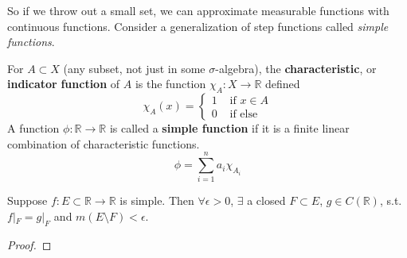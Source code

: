   So if we throw out a small set, we can approximate measurable functions with continuous functions. Consider a generalization of step functions called \textit{simple functions}. 

  \begin{definition}
    For $A \subset X$ (any subset, not just in some $\sigma$-algebra), the \textbf{characteristic}, or \textbf{indicator} \textbf{function} of $A$ is the function $\chi_A : X \longrightarrow \mathbb{R}$ defined 
    \begin{equation}
      \chi_A (x) = \begin{cases} 1 & \text{ if } x \in A \\ 0 & \text{ if else} \end{cases}
    \end{equation}
    A function $\phi: \mathbb{R} \longrightarrow \mathbb{R}$ is called a \textbf{simple function} if it is a finite linear combination of characteristic functions. 
    \begin{equation}
      \phi = \sum_{i=1}^n a_i \chi_{A_i}
    \end{equation}
  \end{definition} 

  \begin{lemma}
    Suppose $f: E \subset \mathbb{R} \to \mathbb{R}$ is simple. Then $\forall \epsilon > 0$, $\exists$ a closed $F \subset E$, $g \in C(\mathbb{R})$, s.t. $f|_F = g |_F$ and $m(E \setminus F) < \epsilon$. 
  \end{lemma}
  \begin{proof}
    
  \end{proof}

